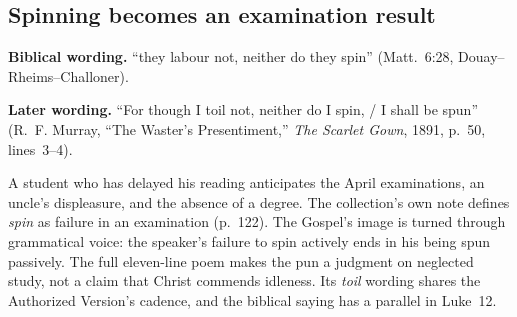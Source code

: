 \subsection*{Spinning becomes an examination result\enspace{}}

\textbf{Biblical wording.} ``they labour not, neither do they spin''
(Matt.~6:28, Douay--Rheims--Challoner).

\textbf{Later wording.} ``For though I toil not, neither do I spin, / I shall
be spun'' (R.~F. Murray, ``The Waster's Presentiment,'' \emph{The Scarlet
Gown}, 1891, p.~50, lines~3--4).

A student who has delayed his reading anticipates the April examinations,
an uncle's displeasure, and the absence of a degree. The collection's own
note defines \emph{spin} as failure in an examination (p.~122). The Gospel's
image is turned through grammatical voice: the speaker's failure to spin
actively ends in his being spun passively. The full eleven-line poem makes
the pun a judgment on neglected study, not a claim that Christ commends
idleness. Its \emph{toil} wording shares the Authorized Version's cadence,
and the biblical saying has a parallel in Luke~12.
